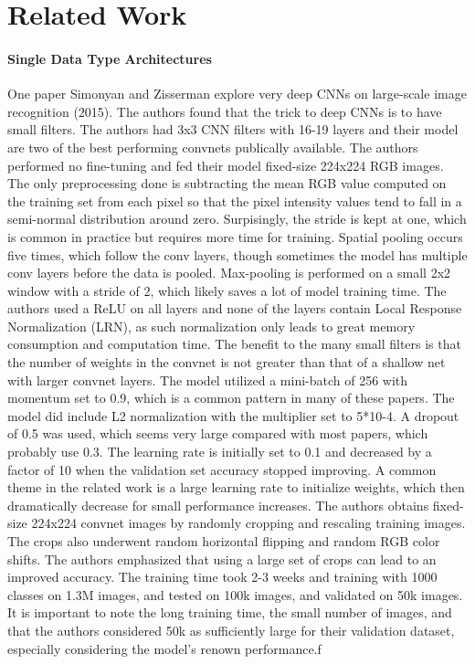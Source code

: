 
\chapter{Related Work}

\subsubsection{Single Data Type Architectures}
One paper Simonyan and Zisserman explore very deep CNNs on large-scale image recognition (2015).  The authors found that the trick to deep CNNs is to have small filters.  The authors had 3x3 CNN filters with 16-19 layers and their model are two of the best performing convnets publically available.  The authors performed no fine-tuning and fed their model fixed-size 224x224 RGB images.  The only preprocessing done is subtracting the mean RGB value computed on the training set from each pixel so that the pixel intensity values tend to fall in a semi-normal distribution around zero.  Surpisingly, the stride is kept at one, which is common in practice but requires more time for training.  Spatial pooling occurs five times, which follow the conv layers, though sometimes the model has multiple conv layers before the data is pooled.  Max-pooling is performed on a small 2x2 window with a stride of 2, which likely saves a lot of model training time.  The authors used a ReLU on all layers and none of the layers contain Local Response Normalization (LRN), as such normalization only leads to great memory consumption and computation time.  The benefit to the many small filters is that the number of weights in the convnet is not greater than that of a shallow net with larger convnet layers.  The model utilized a mini-batch of 256 with momentum set to 0.9, which is a common pattern in many of these papers.  The model did include L2 normalization with the multiplier set to 5*10-4.  A dropout of 0.5 was used, which seems very large compared with most papers, which probably use 0.3.  The learning rate is initially set to 0.1 and decreased by a factor of 10 when the validation set accuracy stopped improving.  A common theme in the related work is a large learning rate to initialize weights, which then dramatically decrease for small performance increases.  The authors obtains fixed-size 224x224 convnet images by randomly cropping and rescaling training images.  The crops also underwent random horizontal flipping and random RGB color shifts.  The authors emphasized that using a large set of crops can lead to an improved accuracy.  The training time took 2-3 weeks and training with 1000 classes on 1.3M images, and tested on 100k images, and validated on 50k images.  It is important to note the long training time, the small number of images, and that the authors considered 50k as sufficiently large for their validation dataset, especially considering the model's renown performance.f

